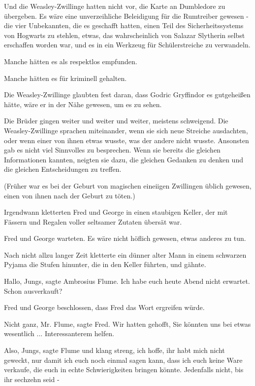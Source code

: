 Und die Weasley-Zwillinge hatten nicht vor, die Karte an Dumbledore zu
übergeben. Es wäre eine unverzeihliche Beleidigung für die Rumtreiber gewesen -
die vier Unbekannten, die es geschafft hatten, einen Teil des Sicherheitssystems
von Hogwarts zu stehlen, etwas, das wahrscheinlich von Salazar Slytherin selbst
erschaffen worden war, und es in ein Werkzeug für Schülerstreiche zu verwandeln.

Manche hätten es als respektlos empfunden.

Manche hätten es für kriminell gehalten.

Die Weasley-Zwillinge glaubten fest daran, dass Godric Gryffindor es gutgeheißen
hätte, wäre er in der Nähe gewesen, um es zu sehen.

Die Brüder gingen weiter und weiter und weiter, meistens schweigend. Die
Weasley-Zwillinge sprachen miteinander, wenn sie sich neue Streiche ausdachten,
oder wenn einer von ihnen etwas wusste, was der andere nicht wusste. Ansonsten
gab es nicht viel Sinnvolles zu besprechen. Wenn sie bereits die gleichen
Informationen kannten, neigten sie dazu, die gleichen Gedanken zu denken und die
gleichen Entscheidungen zu treffen.

(Früher war es bei der Geburt von magischen eineiigen Zwillingen üblich gewesen,
einen von ihnen nach der Geburt zu töten.)

Irgendwann kletterten Fred und George in einen staubigen Keller, der mit Fässern
und Regalen voller seltsamer Zutaten übersät war.

Fred und George warteten. Es wäre nicht höflich gewesen, etwas anderes zu tun.

Nach nicht allzu langer Zeit kletterte ein dünner alter Mann in einem schwarzen
Pyjama die Stufen hinunter, die in den Keller führten, und gähnte.

\glqq{}Hallo, Jungs\grqq{}, sagte Ambrosius Flume. \glqq{}Ich habe euch heute
Abend nicht erwartet. Schon ausverkauft?\grqq{}

Fred und George beschlossen, dass Fred das Wort ergreifen würde.

\glqq{}Nicht ganz, Mr. Flume\grqq{}, sagte Fred. \glqq{}Wir hatten gehofft, Sie
könnten uns bei etwas wesentlich ... Interessanterem helfen.\grqq{}

\glqq{}Also, Jungs\grqq{}, sagte Flume und klang streng, \glqq{}ich hoffe, ihr
habt mich nicht geweckt, nur damit ich euch noch einmal sagen kann, dass ich
euch keine Ware verkaufe, die euch in echte Schwierigkeiten bringen könnte.
Jedenfalls nicht, bis ihr sechzehn seid -\grqq{}

